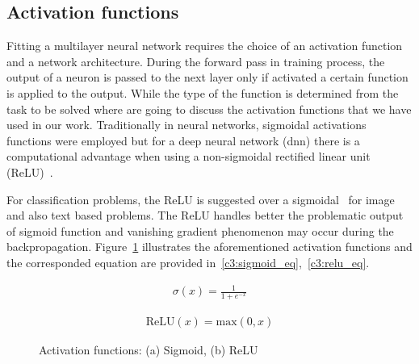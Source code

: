 \subsection{Activation functions}
\label{c3:activation_functions_sec}

Fitting a multilayer neural network requires the choice of an activation function and a network architecture. During the forward pass in training process, the output of a neuron is passed to the next layer only if activated a certain function is applied to the output. While the type of the function is determined from the task to be solved where are going to discuss the activation functions that we have used in our work.
Traditionally in neural networks, sigmoidal activations functions were employed but for a deep neural network (dnn) there is a computational advantage when using a non-sigmoidal rectified linear unit (ReLU)~\cite{schmidt2020nonparametric}.

For classification problems, the ReLU is suggested over a sigmoidal~\cite{glorot2011deep} for image and also text based problems. The ReLU handles better the problematic output of sigmoid function and vanishing gradient phenomenon may occur during the backpropagation. Figure~\ref{c3:activation_functions} illustrates the aforementioned activation functions and the corresponded equation are provided in~\ref{c3:sigmoid_eq},~\ref{c3:relu_eq}.
\begin{ceqn}
\label{c3:sigmoid_eq}
\begin{align}
    \sigma(x) = \frac{1}{1+e^{-x}}
\end{align}
\end{ceqn}

\begin{ceqn}
\label{c3:relu_eq}
\begin{align}
  \text{ReLU}(x) = \text{max}(0,x)
\end{align}
\end{ceqn}

\begin{figure}[ht!]
    \centering  
    \caption{Activation functions: (a) Sigmoid, (b) ReLU }
    \label{c3:activation_functions}
\end{figure}

